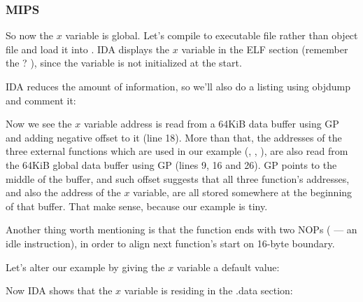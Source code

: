 \subsubsection{MIPS}


So now the $x$ variable is global.
Let's compile to executable file rather than object file and load it into \IDA.
IDA displays the $x$ variable in the  ELF section (remember the ? ),
since the variable is not initialized at the start.



IDA reduces the amount of information, so we'll also do a listing using objdump and comment it:



Now we see the $x$ variable address is read from a 64KiB data buffer using GP and adding negative offset to it (line 18).
More than that, the addresses of the three external functions  which are used in our example (\puts, \scanf, \printf), are also read from the 64KiB global data buffer using GP (lines 9, 16 and 26).
GP points to the middle of the buffer, and such offset suggests that all three function's addresses,
and also the address of the $x$ variable, are all stored somewhere at the beginning of that buffer.
That make sense, because our example is tiny.


Another thing worth mentioning is that the function ends with two \ac{NOP}s ( --- an idle instruction), in order to align next function's start on 16-byte boundary.


Let's alter our example by giving the $x$ variable a default value:



Now IDA shows that the $x$ variable is residing in the .data section:



